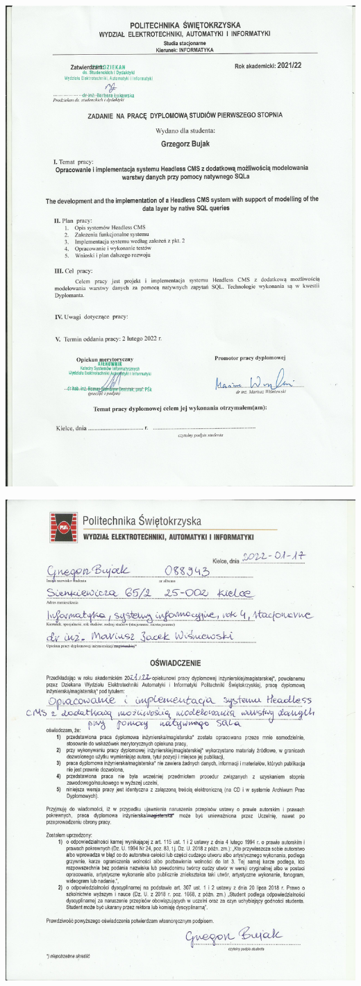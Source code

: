 \centerline{\includegraphics{./img/oryginal.jpg}}
\restoregeometry

\clearpage

\centerline{\includegraphics{./img/oswiadczenie.jpg}}
\restoregeometry

\afterpage{\null\newpage}
\clearpage
